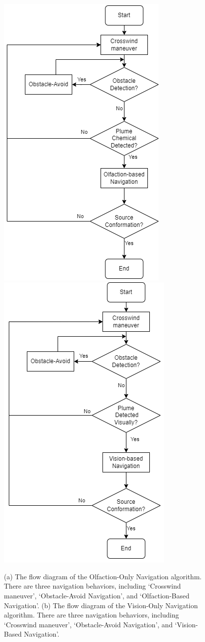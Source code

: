 \begin{figure}[h!] %
\ \\
\vspace*{-.18in}
\begin{center}
\includegraphics[width=0.4\columnwidth]{Main/Figure/OlfactionFlowDiagram.png}\hspace*{0.04in}
\includegraphics[width=0.4\columnwidth]{Main/Figure/VisionFlowDiagram.png}\hspace*{0.04in}
\end{center}
\vspace{-.1in}

\caption
{(a) The flow diagram of the Olfaction-Only Navigation algorithm. There are three navigation behaviors, including `Crosswind maneuver', `Obstacle-Avoid Navigation', and `Olfaction-Based Navigation'. {(b)} The flow diagram of the Vision-Only Navigation algorithm. There are three navigation behaviors, including `Crosswind maneuver', `Obstacle-Avoid Navigation', and `Vision-Based Navigation'.}
\label{fig:comparisonAlgorithm}
\end{figure}


